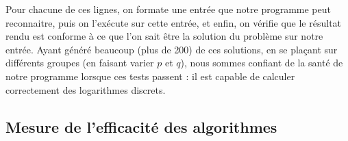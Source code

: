       Pour chacune de ces lignes, on formate une entrée que notre programme peut reconnaitre, puis on l'exécute sur cette entrée, et enfin, on vérifie que le résultat rendu est conforme à ce que l'on sait être la solution du problème sur notre entrée.
      Ayant généré beaucoup (plus de 200) de ces solutions, en se plaçant sur différents groupes (en faisant varier $p$ et $q$), nous sommes confiant de la santé de notre programme lorsque ces tests passent : il est capable de calculer correctement des logarithmes discrets.


      \subsection{Mesure de l'efficacité des algorithmes}
